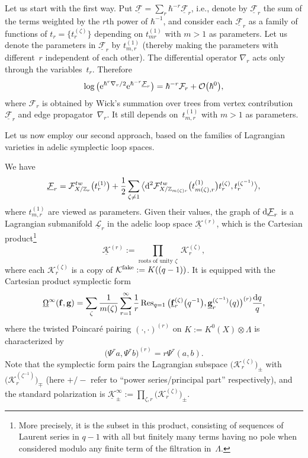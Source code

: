 \documentclass[pdftex]{sigma}
\def\F{\mathcal F}
\def\K{\mathcal K}
\def\L{\mathcal L}
\def\O{\mathcal O}
\def\ZZ{\mathbb Z}
\def\Res{\operatorname{Res}}
\def\f{{\mathbf f}}
\def\g{{\mathbf g}}
\def\h{\hbar}
\def\lan{\langle}
\def\ran{\rangle}
\def\und{\underline}
\begin{document}
Let us start with the first way. Put $\und{\F}=\sum_r \h^{-r}\und{\F}_r$, i.e.,
denote by $\und{\F}_r$ the sum of the terms weighted by the $r$th power of $\h^{-1}$, and consider each $\und{\F}_r$ as a family of functions of
$t_r =\big\{ t_r^{(\zeta)} \big\}$ depending on $t_{mr}^{(1)}$ with $m>1$ as parameters.
Let us denote the parameters in $\und{\F}_r$ by $t_{m,r}^{(1)}$ (thereby making the parameters with different~$r$ independent of each other). The differential operator $\nabla_r$ acts only through the variables~$t_r$. Therefore
\[ \log \big( {\rm e}^{\h^r\nabla_r/2} {\rm e}^{\h^{-r}\und{\F}_r} \big) = \h^{-r} \F_r + \O\big(\h^0\big),\]
where $\F_r$ is obtained by Wick's summation over trees from vertex contribution $\und{\F}_r$ and edge propagator~$\nabla_r$. It still depends on~$t_{m,r}^{(1)}$ with $m>1$ as parameters.

Let us now employ our second approach, based on the families of Lagrangian varieties in adelic symplectic loop spaces.

We have
\[ \und{\F}_r = \F_{X/\ZZ_r}^{tw}\big(t^{(1)}_r\big) +\frac{1}{2}\sum_{\zeta\neq 1}
\big\lan {\rm d}^2 \F^{tw}_{X/\ZZ_{m(\zeta)r}} \big(t_{m(\zeta),r}^{(1)}\big) t_r^{(\zeta)}, t_r^{(\zeta^{-1})}\big\ran,\]
where $t_{m,r}^{(1)}$ are viewed as parameters. Given their values, the graph of
${\rm d}\und{\F}_r$ is a Lagrangian submanifold $\und{\L}_r$ in the adelic loop space
$\und{\K}^{(r)}$, which is the Cartesian product\footnote{More precisely, it is the subset in this product, consisting of sequences of Laurent series in $q-1$ with all but finitely many terms having no pole when considered modulo any finite term of the filtration in~$\Lambda$.}
\[ \und{\K}^{(r)}:=\prod_{\text{roots of unity $\zeta$}}\ \K_r^{(\zeta)},\]
where each $\K_r^{(\zeta)}$ is a copy of $\K^{\rm fake}:=K((q-1))$. It is equipped with the Cartesian product symplectic form
\[ \und{\Omega}^{\infty}(\f,\g)=\sum_{\zeta} \frac{1}{m(\zeta)} \sum_{r=1}^{\infty} \frac{1}{r} \Res_{q=1}\big(\und{\f}_r^{(\zeta)}\big(q^{-1}\big),\und{\g}_r^{(\zeta^{-1})}(q)\big)^{(r)} \frac{{\rm d}q}{q},\]
where the twisted Poincar\'e pairing $(\cdot ,\cdot )^{(r)}$ on $K:=K^0(X)\otimes \Lambda$ is characterized by
\[ \big(\Psi^r a, \Psi^r b\big)^{(r)} = r \Psi^r(a,b).\]
Note that the symplectic form pairs the Lagrangian subspace $\big(\K_r^{(\zeta)}\big)_{\pm}$ with $\big(\K_r^{(\zeta^{-1})}\big)_{\mp}$ (here $+/-$ refer to ``power series/principal part'' respectively), and the standard polarization is $\und{\K}^{\infty}_{\pm}:=\prod_{\zeta, r} \big(\K_r^{(\zeta)}\big)_{\pm}$.
\end{document}
